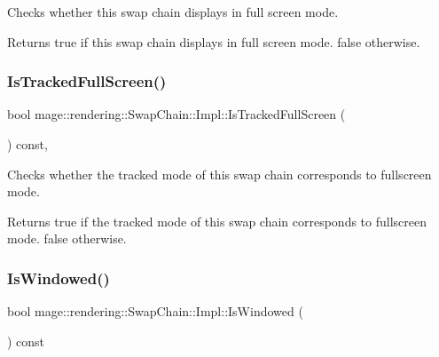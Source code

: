 Checks whether this swap chain displays in full screen mode.

\begin{DoxyReturn}{Returns}
{\ttfamily true} if this swap chain displays in full screen mode. {\ttfamily false} otherwise. 
\end{DoxyReturn}
\mbox{\label{classmage_1_1rendering_1_1_swap_chain_1_1_impl_a47dd7e6a9a21395fc4d79dfda3d9cd61}} 
\subsubsection{\texorpdfstring{Is\+Tracked\+Full\+Screen()}{IsTrackedFullScreen()}}
{\footnotesize\ttfamily bool mage\+::rendering\+::\+Swap\+Chain\+::\+Impl\+::\+Is\+Tracked\+Full\+Screen (\begin{DoxyParamCaption}{ }\end{DoxyParamCaption}) const\hspace{0.3cm}{\ttfamily [private]}, {\ttfamily [noexcept]}}

Checks whether the tracked mode of this swap chain corresponds to fullscreen mode.

\begin{DoxyReturn}{Returns}
{\ttfamily true} if the tracked mode of this swap chain corresponds to fullscreen mode. {\ttfamily false} otherwise. 
\end{DoxyReturn}
\mbox{\label{classmage_1_1rendering_1_1_swap_chain_1_1_impl_ac7216dc943fad37a078d1a9d18eb1491}} 
\subsubsection{\texorpdfstring{Is\+Windowed()}{IsWindowed()}}
{\footnotesize\ttfamily bool mage\+::rendering\+::\+Swap\+Chain\+::\+Impl\+::\+Is\+Windowed (\begin{DoxyParamCaption}{ }\end{DoxyParamCaption}) const\hspace{0.3cm}{\ttfamily [noexcept]}}

